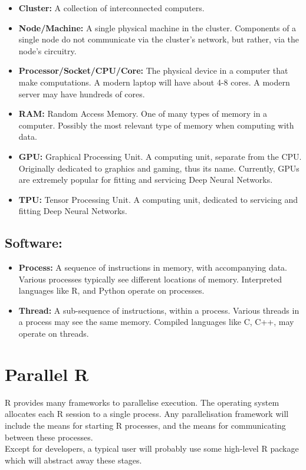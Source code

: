\documentclass[]{book}
\providecommand{\tightlist}{%
  \setlength{\itemsep}{0pt}\setlength{\parskip}{0pt}}
\theoremstyle{definition}
\theoremstyle{definition}
\theoremstyle{definition}
\theoremstyle{remark}
\begin{document}
\begin{itemize}
\tightlist
\item
  \textbf{Cluster:} A collection of interconnected computers.
\item
  \textbf{Node/Machine:} A single physical machine in the cluster. Components of a single node do not communicate via the cluster's network, but rather, via the node's circuitry.
\item
  \textbf{Processor/Socket/CPU/Core:} The physical device in a computer that make computations. A modern laptop will have about 4-8 cores. A modern server may have hundreds of cores.
\item
  \textbf{RAM:} Random Access Memory. One of many types of memory in a computer. Possibly the most relevant type of memory when computing with data.
\item
  \textbf{GPU:} Graphical Processing Unit. A computing unit, separate from the CPU. Originally dedicated to graphics and gaming, thus its name. Currently, GPUs are extremely popular for fitting and servicing Deep Neural Networks.
\item
  \textbf{TPU:} Tensor Processing Unit. A computing unit, dedicated to servicing and fitting Deep Neural Networks.
\end{itemize}

\hypertarget{software}{%
\subsection{Software:}\label{software}}

\begin{itemize}
\tightlist
\item
  \textbf{Process:} A sequence of instructions in memory, with accompanying data. Various processes typically see different locations of memory. Interpreted languages like R, and Python operate on processes.
\item
  \textbf{Thread:} A sub-sequence of instructions, within a process. Various threads in a process may see the same memory. Compiled languages like C, C++, may operate on threads.
\end{itemize}

\hypertarget{parallel-r}{%
\section{Parallel R}\label{parallel-r}}

R provides many frameworks to parallelise execution.
The operating system allocates each R session to a single process.
Any parallelisation framework will include the means for starting R processes, and the means for communicating between these processes.\\
Except for developers, a typical user will probably use some high-level R package which will abstract away these stages.
\end{document}
